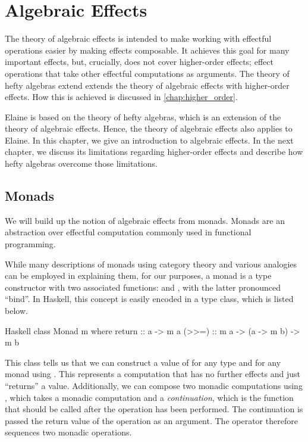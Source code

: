 \chapter{Algebraic Effects}\label{chap:algebraic_effects}

The theory of algebraic effects is intended to make working with effectful operations easier by making effects composable. It achieves this goal for many important effects, but, crucially, does not cover higher-order effects; effect operations that take other effectful computations as arguments. The theory of hefty algebras extend extends the theory of algebraic effects with higher-order effects. How this is achieved is discussed in \cref{chap:higher_order}.

Elaine is based on the theory of hefty algebras, which is an extension of the theory of algebraic effects. Hence, the theory of algebraic effects also applies to Elaine. In this chapter, we give an introduction to algebraic effects. In the next chapter, we discuss its limitations regarding higher-order effects and describe how hefty algebras overcome those limitations.

\section{Monads}

We will build up the notion of algebraic effects from monads. Monads are an abstraction over effectful computation commonly used in functional programming.

While many descriptions of monads using category theory and various analogies can be employed in explaining them, for our purposes, a monad is a type constructor  with two associated functions:  and \hs{>>=}, with the latter pronounced ``bind''. In Haskell, this concept is easily encoded in a type class, which is listed below.

\begin{lst}{Haskell}
class Monad m where
  return :: a -> m a
  (>>=) :: m a -> (a -> m b) -> m b
\end{lst}

\noindent This class tells us that we can construct a value of  for any type  and for any monad  using . This represents a computation that has no further effects and just ``returns'' a value. Additionally, we can compose two monadic computations using \hs{>>=}, which takes a monadic computation and a \emph{continuation}, which is the function that should be called after the operation has been performed. The continuation is passed the return value of the operation as an argument. The \hs{>>=} operator therefore sequences two monadic operations.

